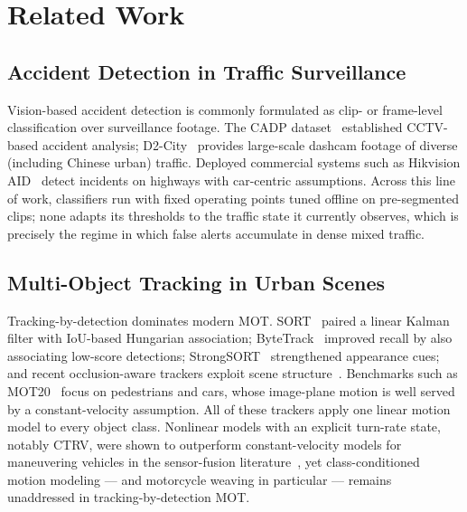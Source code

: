 
\section{Related Work}
\label{sec:related}

\subsection{Accident Detection in Traffic Surveillance}
\label{subsec:rw_accident}

Vision-based accident detection is commonly formulated as clip- or
frame-level classification over surveillance footage.
The CADP dataset~\cite{Shah2018_cadp} established CCTV-based accident
analysis; D2-City~\cite{Che2019_d2city} provides large-scale dashcam
footage of diverse (including Chinese urban) traffic.
Deployed commercial systems such as Hikvision AID~\cite{Hikvision_AID}
detect incidents on highways with car-centric assumptions.
Across this line of work, classifiers run with fixed operating points
tuned offline on pre-segmented clips; none adapts its thresholds to the
traffic state it currently observes, which is precisely the regime in
which false alerts accumulate in dense mixed traffic.

\subsection{Multi-Object Tracking in Urban Scenes}
\label{subsec:rw_mot}

Tracking-by-detection dominates modern MOT.
SORT~\cite{Bewley2016_sort} paired a linear Kalman filter with
IoU-based Hungarian association; ByteTrack~\cite{Zhang2022_bytetrack}
improved recall by also associating low-score detections;
StrongSORT~\cite{Du2023_strongsort} strengthened appearance cues; and
recent occlusion-aware trackers exploit scene
structure~\cite{Hashempoor2025_fasttracker}.
Benchmarks such as MOT20~\cite{Dendorfer2020_mot20} focus on
pedestrians and cars, whose image-plane motion is well served by a
constant-velocity assumption.
All of these trackers apply one linear motion model to every object
class.
Nonlinear models with an explicit turn-rate state, notably CTRV,
were shown to outperform constant-velocity models for maneuvering
vehicles in the sensor-fusion literature~\cite{Schubert2008_ctrv}, yet
class-conditioned motion modeling --- and motorcycle weaving in
particular --- remains unaddressed in tracking-by-detection MOT.

